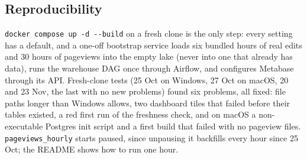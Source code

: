 \subsection{Reproducibility}\label{sec:impl-repro}

\texttt{docker compose up -d -{}-build} on a fresh clone is the only step: every setting has a default,
and a one-off bootstrap service loads six bundled hours of real edits and 30 hours of pageviews into the empty lake (never into
one that already has data), runs the warehouse DAG once through Airflow, and configures Metabase
through its API. Fresh-clone tests (25 Oct on Windows, 27 Oct on macOS, 20 and 23 Nov, the last with no new problems) found six problems, all fixed: file paths longer than
Windows allows, two dashboard tiles that failed before their tables existed, a red first run of the
freshness check, and on macOS a non-executable Postgres init script and a first build that failed with no pageview files.
\texttt{pageviews\_hourly} starts paused, since unpausing it backfills every hour since 25 Oct; the README
shows how to run one hour.
